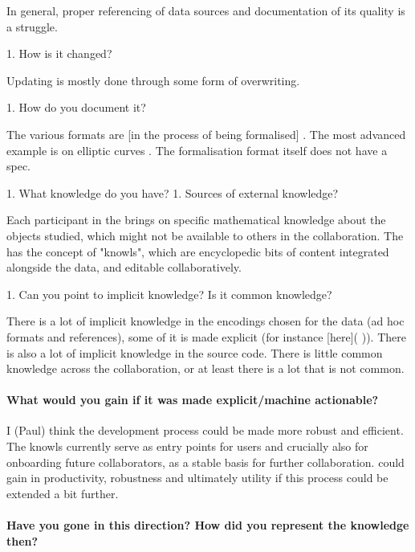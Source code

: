     In general, proper referencing of data sources and documentation of its quality is a struggle.

 1. How is it changed?

   Updating is mostly done through some form of overwriting.

 1. How do you document it?

   The various formats are [in the process of being formalised]
   . The most advanced example is on elliptic curves
   . The formalisation format itself does not have a spec.

1. What knowledge do you have?
 1. Sources of external knowledge?

   Each participant in the \LMFDB brings on specific mathematical knowledge about the objects studied, which might not be available to others in the collaboration. The \LMFDB has the concept of "knowls", which are encyclopedic bits of content integrated alongside the data, and editable collaboratively.

 1. Can you point to implicit knowledge? Is it common knowledge?

   There is a lot of implicit knowledge in the encodings chosen for the data (ad hoc formats and references), some of it is made explicit (for instance [here](
   )). There is also a lot of implicit knowledge in the source code. There is little common knowledge across the collaboration, or at least there is a lot that is not common.

 \paragraph{What would you gain if it was made explicit/machine actionable?}

   I (Paul) think the development process could be made more robust and efficient. The knowls currently serve as entry points for users and crucially also for onboarding future collaborators, as a stable basis for further collaboration. \LMFDB could gain in productivity, robustness and ultimately utility if this process could be extended a bit further.

 \paragraph{Have you gone in this direction? How did you represent the knowledge then?}

